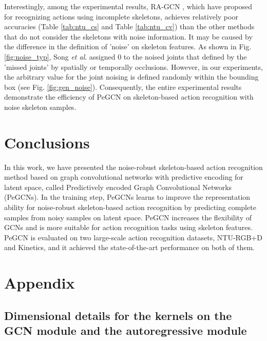 \documentclass[runningheads]{llncs}
\newcommand{\etal}{\textit{et al}. }
\begin{document}
Interestingly, among the experimental results, RA-GCN \cite{song2019richly}, which have proposed for recognizing actions using incomplete skeletons, achieves relatively poor accuracies (Table \ref{tab:ntu_cs} and Table \ref{tab:ntu_cv}) than the other methods \cite{shi2019two,yan2018spatial,shi2019skeleton} that do not consider the skeletons with noise information. It may be caused by the difference in the definition of 'noise' on skeleton features. 
As shown in Fig. \ref{fig:noise_typ}, Song \etal \cite{song2019richly} assigned 0 to the noised joints that defined by the 'missed joints' by spatially or temporally occlusions.  However, in our experiments, the arbitrary value for the joint noising is defined randomly within the bounding box (see Fig. \ref{fig:gen_noise}). Consequently, the entire experimental results demonstrate the efficiency of PeGCN on skeleton-based action recognition with noise skeleton samples. 

\section{Conclusions}\label{sec:5}
In this work, we have presented the noise-robust skeleton-based action recognition method based on graph convolutional networks with predictive encoding for latent space, called Predictively encoded Graph Convolutional Networks (PeGCNs). In the training step, PeGCNs learns to improve the representation ability for noise-robust skeleton-based action recognition by predicting complete samples from noisy samples on latent space. PeGCN increases the flexibility of GCNs and is more suitable for action recognition tasks using skeleton features. PeGCN is evaluated on two large-scale action recognition datasets, NTU-RGB+D and Kinetics, and it achieved the state-of-the-art performance on both of them.

\small



\clearpage
\setcounter{page}{1}
\setcounter{section}{1}
\setcounter{table}{0}
\setcounter{figure}{0}
 \renewcommand{\thesection}{A}
\section*{\centering{}Appendix}

\subsection{Dimensional details for the kernels on the GCN module and the autoregressive module}
\label{apx:1}
\end{document}
